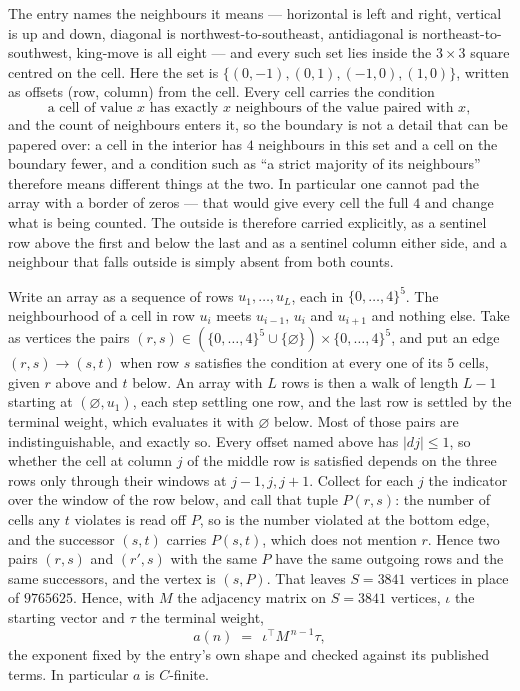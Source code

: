 \documentclass[11pt,a4paper]{article}
\theoremstyle{plain}
\theoremstyle{definition}
\begin{document}
The entry names the neighbours it means --- horizontal is left and right, vertical is up and
down, diagonal is northwest-to-southeast, antidiagonal is northeast-to-southwest, king-move is
all eight --- and every such set lies inside the $3\times3$ square centred on the cell. Here
the set is $\{(0,-1), (0,1), (-1,0), (1,0)\}$, written as offsets (row, column) from the cell. Every cell carries
the condition
\[
\text{a cell of value }x\text{ has exactly }x\text{ neighbours of the value paired with }x,
\]
and the count of neighbours enters it, so the boundary is not a detail that can be papered
over: a cell in the interior has $4$ neighbours in this set and a cell on the boundary
fewer, and a condition such as ``a strict majority of its neighbours'' therefore means
different things at the two. In particular one cannot pad the array with a border of zeros ---
that would give every cell the full $4$ and change what is being counted. The outside is
therefore carried
explicitly, as a sentinel row above the first and below the last and as a sentinel column
either side, and a neighbour that falls outside is simply absent from both counts.

Write an array as a sequence of rows $u_1,\dots,u_L$, each in
$\{0,\dots,4\}^{5}$. The neighbourhood of a cell in row $u_i$ meets $u_{i-1}$,
$u_i$ and $u_{i+1}$ and nothing else. Take as vertices the pairs
$(r,s)\in(\{0,\dots,4\}^{5}\cup\{\varnothing\})\times\{0,\dots,4\}^{5}$,
and put an edge $(r,s)\to(s,t)$ when row $s$ satisfies the condition at every one of its
$5$ cells, given $r$ above and $t$ below. An array with $L$ rows is then a walk of length
$L-1$ starting at $(\varnothing,u_1)$, each step settling one row, and the last row is
settled by the terminal weight, which evaluates it with $\varnothing$ below. Most of those pairs are indistinguishable, and exactly so. Every offset named above has $|dj|\le 1$, so whether the cell at column $j$ of the middle row is satisfied depends on the three rows only through their windows at $j-1,j,j+1$. Collect for each $j$ the indicator over the window of the row below, and call that tuple $P(r,s)$: the number of cells any $t$ violates is read off $P$, so is the number violated at the bottom edge, and the successor $(s,t)$ carries $P(s,t)$, which does not mention $r$. Hence two pairs $(r,s)$ and $(r',s)$ with the same $P$ have the same outgoing rows and the same successors, and the vertex is $(s,P)$. That leaves $S=3841$ vertices in place of $9765625$. Hence,
with $M$ the adjacency matrix on $S=3841$ vertices, $\iota$ the starting vector and $\tau$ the
terminal weight,
\[
a(n)\;=\;\,\iota^{\!\top}M^{\,n-1}\tau ,
\]
the exponent fixed by the entry's own shape and checked against its published terms. In
particular $a$ is $C$-finite.
\end{document}
